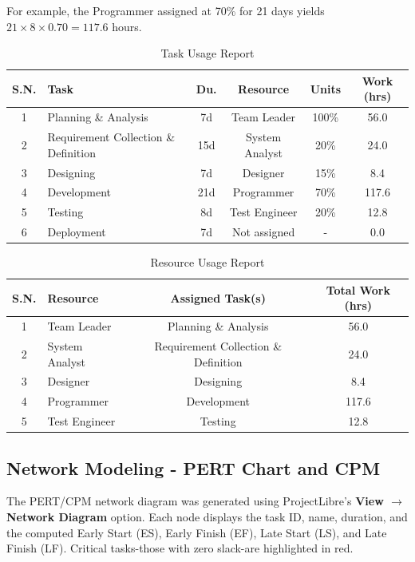 \documentclass[12pt,a4paper]{article}
\begin{document}
For example, the Programmer assigned at 70\% for 21 days yields
$21 \times 8 \times 0.70 = 117.6$ hours.

\begin{table}[h!]
\centering
\renewcommand{\arraystretch}{1.15}
\footnotesize
\renewcommand{\tabcolsep}{4pt}
\begin{tabular}{|c|l|c|c|c|c|}
\hline
\textbf{S.N.} & \textbf{Task} & \textbf{Du.} & \textbf{Resource} & \textbf{Units} & \textbf{Work (hrs)} \\ \hline
1 & Planning \& Analysis & 7d & Team Leader & 100\% & 56.0 \\ \hline
2 & Requirement Collection \& Definition & 15d & System Analyst & 20\% & 24.0 \\ \hline
3 & Designing & 7d & Designer & 15\% & 8.4 \\ \hline
4 & Development & 21d & Programmer & 70\% & 117.6 \\ \hline
5 & Testing & 8d & Test Engineer & 20\% & 12.8 \\ \hline
6 & Deployment & 7d & Not assigned & - & 0.0 \\ \hline
\end{tabular}
\caption{Task Usage Report}
\end{table}

\begin{table}[h!]
\centering
\renewcommand{\arraystretch}{1.15}
\footnotesize
\renewcommand{\tabcolsep}{4pt}
\begin{tabular}{|c|l|c|c|}
\hline
\textbf{S.N.} & \textbf{Resource} & \textbf{Assigned Task(s)} & \textbf{Total Work (hrs)} \\ \hline
1 & Team Leader & Planning \& Analysis & 56.0 \\ \hline
2 & System Analyst & Requirement Collection \& Definition & 24.0 \\ \hline
3 & Designer & Designing & 8.4 \\ \hline
4 & Programmer & Development & 117.6 \\ \hline
5 & Test Engineer & Testing & 12.8 \\ \hline
\end{tabular}
\caption{Resource Usage Report}
\end{table}

\subsection*{Network Modeling - PERT Chart and CPM}

The PERT/CPM network diagram was generated using ProjectLibre's
\textbf{View $\to$ Network Diagram} option. Each node displays the task ID,
name, duration, and the computed Early Start (ES), Early Finish (EF), Late
Start (LS), and Late Finish (LF). Critical tasks-those with zero
slack-are highlighted in red.
\end{document}

